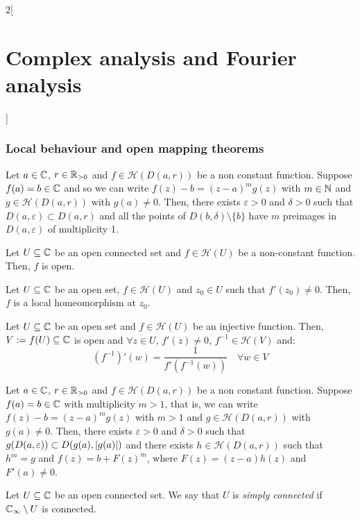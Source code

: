 \documentclass[../../../main.tex]{subfiles}
\begin{document}
\begin{multicols}{2}[\section{Complex analysis and Fourier analysis}]
  \subsubsection{Local behaviour and open mapping theorems}
  \begin{theorem}
    Let $a\in\mathbb{C}$, $r\in\mathbb{R}_{>0}$ and $f\in\mathcal{H}(D(a,r))$ be a non constant function. Suppose $f(a)=b\in \mathbb{C}$ and so we can write $f(z)-b={(z-a)}^mg(z)$ with $m\in\mathbb{N}$ and $g\in\mathcal{H}(D(a,r))$ with $g(a)\ne 0$. Then, there exists $\varepsilon>0$ and $\delta>0$ such that $D(a,\varepsilon)\subset D(a,r)$ and all the points of $D(b,\delta)\setminus\{b\}$ have $m$ preimages in $D(a,\varepsilon)$ of multiplicity 1.
  \end{theorem}
  \begin{theorem}
    Let $U\subseteq\mathbb{C}$ be an open connected set and $f\in\mathcal{H}(U)$ be a non-constant function. Then, $f$ is open.
  \end{theorem}
  \begin{corollary}
    Let $U\subseteq\mathbb{C}$ be an open set, $f\in\mathcal{H}(U)$ and $z_0\in U$ such that $f'(z_0)\ne 0$. Then, $f$ is a local homeomorphism at $z_0$.
  \end{corollary}
  \begin{corollary}
    Let $U\subseteq\mathbb{C}$ be an open set and $f\in\mathcal{H}(U)$ be an injective function. Then, $V:=f(U)\subseteq \mathbb{C}$ is open and $\forall z\in U$, $f'(z)\ne 0$, $f^{-1}\in \mathcal{H}(V)$ and: $${(f^{-1})}'(w)=\frac{1}{f'(f^{-1}(w))}\quad\forall w\in V$$
  \end{corollary}
  \begin{theorem}
    Let $a\in\mathbb{C}$, $r\in\mathbb{R}_{>0}$ and $f\in\mathcal{H}(D(a,r))$ be a non constant function. Suppose $f(a)=b\in \mathbb{C}$ with multiplicity $m>1$, that is, we can write $f(z)-b={(z-a)}^mg(z)$ with $m>1$ and $g\in\mathcal{H}(D(a,r))$ with $g(a)\ne 0$. Then, there exists $\varepsilon>0$ and $\delta>0$ such that $g(D(a,\varepsilon))\subset D(g(a),\abs{g(a)})$ and there exists $h\in \mathcal{H}(D(a,r))$ such that $h^m=g$ and $f(z)=b+{F(z)}^m$, where $F(z)=(z-a)h(z)$ and $F'(a)\ne 0$.
  \end{theorem}
  \begin{definition}
    Let $U\subseteq\mathbb{C}$ be an open connected set. We say that $U$ is \emph{simply connected} if $\mathbb{C}_\infty\setminus U$ is connected.
  \end{definition}
  \begin{proposition}

\end{proposition}
\end{multicols}
\end{document}
